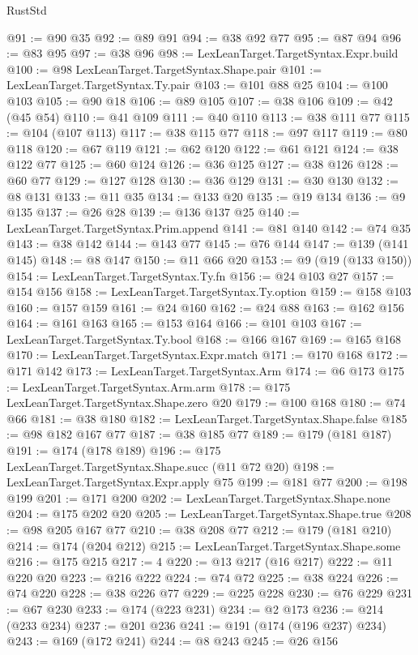 \begin{lexlean}{RustStd}
\begin{coremodule}
@91 := @90 @35
@92 := @89 @91
@94 := @38 @92 @77
@95 := @87 @94
@96 := @83 @95
@97 := @38 @96
@98 := LexLeanTarget.TargetSyntax.Expr.build
@100 := @98 LexLeanTarget.TargetSyntax.Shape.pair
@101 := LexLeanTarget.TargetSyntax.Ty.pair
@103 := @101 @88 @25
@104 := @100 @103
@105 := @90 @18
@106 := @89 @105
@107 := @38 @106
@109 := @42 (@45 @54)
@110 := @41 @109
@111 := @40 @110
@113 := @38 @111 @77
@115 := @104 (@107 @113)
@117 := @38 @115 @77
@118 := @97 @117
@119 := @80 @118
@120 := @67 @119
@121 := @62 @120
@122 := @61 @121
@124 := @38 @122 @77
@125 := @60 @124
@126 := @36 @125
@127 := @38 @126
@128 := @60 @77
@129 := @127 @128
@130 := @36 @129
@131 := @30 @130
@132 := @8 @131
@133 := @11 @35
@134 := @133 @20
@135 := @19 @134
@136 := @9 @135
@137 := @26 @28
@139 := @136 @137 @25
@140 := LexLeanTarget.TargetSyntax.Prim.append
@141 := @81 @140
@142 := @74 @35
@143 := @38 @142
@144 := @143 @77
@145 := @76 @144
@147 := @139 (@141 @145)
@148 := @8 @147
@150 := @11 @66 @20
@153 := @9 (@19 (@133 @150))
@154 := LexLeanTarget.TargetSyntax.Ty.fn
@156 := @24 @103 @27
@157 := @154 @156
@158 := LexLeanTarget.TargetSyntax.Ty.option
@159 := @158 @103
@160 := @157 @159
@161 := @24 @160
@162 := @24 @88
@163 := @162 @156
@164 := @161 @163
@165 := @153 @164
@166 := @101 @103
@167 := LexLeanTarget.TargetSyntax.Ty.bool
@168 := @166 @167
@169 := @165 @168
@170 := LexLeanTarget.TargetSyntax.Expr.match
@171 := @170 @168
@172 := @171 @142
@173 := LexLeanTarget.TargetSyntax.Arm
@174 := @6 @173
@175 := LexLeanTarget.TargetSyntax.Arm.arm
@178 := @175 LexLeanTarget.TargetSyntax.Shape.zero @20
@179 := @100 @168
@180 := @74 @66
@181 := @38 @180
@182 := LexLeanTarget.TargetSyntax.Shape.false
@185 := @98 @182 @167 @77
@187 := @38 @185 @77
@189 := @179 (@181 @187)
@191 := @174 (@178 @189)
@196 := @175 LexLeanTarget.TargetSyntax.Shape.succ (@11 @72 @20)
@198 := LexLeanTarget.TargetSyntax.Expr.apply @75
@199 := @181 @77
@200 := @198 @199
@201 := @171 @200
@202 := LexLeanTarget.TargetSyntax.Shape.none
@204 := @175 @202 @20
@205 := LexLeanTarget.TargetSyntax.Shape.true
@208 := @98 @205 @167 @77
@210 := @38 @208 @77
@212 := @179 (@181 @210)
@214 := @174 (@204 @212)
@215 := LexLeanTarget.TargetSyntax.Shape.some
@216 := @175 @215
@217 := 4
@220 := @13 @217 (@16 @217)
@222 := @11 @220 @20
@223 := @216 @222
@224 := @74 @72
@225 := @38 @224
@226 := @74 @220
@228 := @38 @226 @77
@229 := @225 @228
@230 := @76 @229
@231 := @67 @230
@233 := @174 (@223 @231)
@234 := @2 @173
@236 := @214 (@233 @234)
@237 := @201 @236
@241 := @191 (@174 (@196 @237) @234)
@243 := @169 (@172 @241)
@244 := @8 @243
@245 := @26 @156

\end{coremodule}
\end{lexlean}
